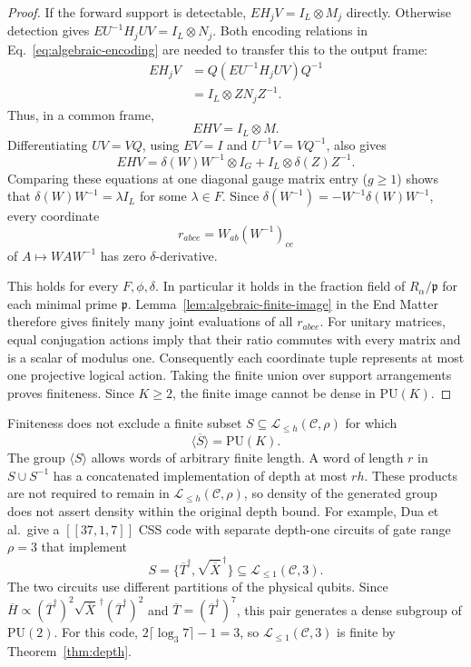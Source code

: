 \documentclass[aps,prl,reprint,notitlepage,nofootinbib,nobibnotes]{revtex4-2}
\newcommand{\PU}{\mathrm{PU}}
\newcommand{\id}{I}
\begin{document}
\begin{proof}
If the forward support is detectable, \(EH_jV=\id_L\otimes M_j\)
directly. Otherwise detection gives
\(EU^{-1}H_jUV=\id_L\otimes N_j\).
Both encoding relations in Eq.~\eqref{eq:algebraic-encoding} are
needed to transfer this to the output frame:
\begin{align*}
 EH_jV
 &=Q(EU^{-1}H_jUV)Q^{-1}\\
 &=\id_L\otimes ZN_jZ^{-1}.
\end{align*}
Thus, in a common frame,
\begin{equation}\label{eq:compression}
 EHV=\id_L\otimes M.
\end{equation}
Differentiating \(UV=VQ\), using \(EV=\id\) and
\(U^{-1}V=VQ^{-1}\), also gives
\begin{equation}\label{eq:logicalgen}
 EHV=\delta(W)W^{-1}\otimes\id_G+
       \id_L\otimes\delta(Z)Z^{-1}.
\end{equation}
Comparing these equations at one diagonal gauge matrix entry
(\(g\ge1\)) shows that \(\delta(W)W^{-1}=\lambda\id_L\) for some
\(\lambda\in F\). Since
\(\delta(W^{-1})=-W^{-1}\delta(W)W^{-1}\), every coordinate
\begin{equation}\label{eq:conjugation-coordinates}
 r_{abce}=W_{ab}(W^{-1})_{ce}
\end{equation}
of \(A\mapsto WAW^{-1}\) has zero \(\delta\)-derivative.

This holds for every \(F,\phi,\delta\). In particular it holds in the
fraction field of \(R_\alpha/\mathfrak p\) for each minimal prime
\(\mathfrak p\). Lemma~\ref{lem:algebraic-finite-image} in the End
Matter therefore gives finitely many joint evaluations of all
\(r_{abce}\). For unitary matrices, equal conjugation actions imply
that their ratio commutes with every matrix and is a scalar of modulus
one. Consequently each coordinate tuple represents at most one
projective logical action. Taking the finite union over support
arrangements proves finiteness. Since \(K\ge2\), the finite image
cannot be dense in \(\PU(K)\).
\end{proof}


Finiteness does not exclude a finite subset \(S\subseteq\mathcal L_{\le h}(\mathcal C,\rho)\)
for which
\[
 \overline{\langle S\rangle}=\PU(K).
\]
The group \(\langle S\rangle\) allows words of arbitrary finite length.
A word of length \(r\) in \(S\cup S^{-1}\) has a concatenated
implementation of depth at most \(rh\). These products are not required
to remain in \(\mathcal L_{\le h}(\mathcal C,\rho)\), so density of the generated group does not
assert density within the original depth bound.
For example, Dua et al.\ give a \([[37,1,7]]\) CSS code with separate depth-one
circuits of gate range \(\rho=3\) that
implement~\cite[Sec.~V and Appendix~B~3]{Dua}
\[
 S=\bigl\{\overline T^\dagger,
          \sqrt{\overline X}^{\,\dagger}\bigr\}
   \subseteq\mathcal L_{\le1}(\mathcal C,3).
\]
The two circuits use different partitions of the physical qubits.
Since \(\overline H\propto
(\overline T^\dagger)^2\sqrt{\overline X}^{\,\dagger}
(\overline T^\dagger)^2\) and
\(\overline T=(\overline T^\dagger)^7\), this pair generates a dense
subgroup of \(\PU(2)\). For this code,
\(2\lceil\log_3 7\rceil-1=3\), so \(\mathcal L_{\le1}(\mathcal C,3)\) is finite by
Theorem~\ref{thm:depth}.
\end{document}
